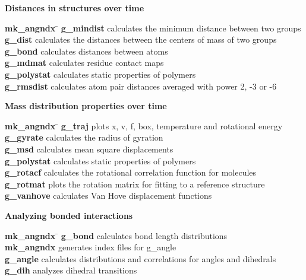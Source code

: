 \begin{description}
\item {\large\bf Distances in structures over time}
\vspace{-2ex}\begin{tabbing}
{\bf mk\_angndx} \= \kill
{\bf g\_mindist} \> calculates the minimum distance between two groups \\
{\bf g\_dist} \> calculates the distances between the centers of mass of two groups \\
{\bf g\_bond} \> calculates distances between atoms \\
{\bf g\_mdmat} \> calculates residue contact maps \\
{\bf g\_polystat} \> calculates static properties of polymers \\
{\bf g\_rmsdist} \> calculates atom pair distances averaged with power 2, -3 or -6 \\
\end{tabbing}\vspace{-2ex}

\item {\large\bf Mass distribution properties over time}
\vspace{-2ex}\begin{tabbing}
{\bf mk\_angndx} \= \kill
{\bf g\_traj} \> plots x, v, f, box, temperature and rotational energy \\
{\bf g\_gyrate} \> calculates the radius of gyration \\
{\bf g\_msd} \> calculates mean square displacements \\
{\bf g\_polystat} \> calculates static properties of polymers \\
{\bf g\_rotacf} \> calculates the rotational correlation function for molecules \\
{\bf g\_rotmat} \> plots the rotation matrix for fitting to a reference structure \\
{\bf g\_vanhove} \> calculates Van Hove displacement functions \\
\end{tabbing}\vspace{-2ex}

\item {\large\bf Analyzing bonded interactions}
\vspace{-2ex}\begin{tabbing}
{\bf mk\_angndx} \= \kill
{\bf g\_bond} \> calculates bond length distributions \\
{\bf mk\_angndx} \> generates index files for g\_angle \\
{\bf g\_angle} \> calculates distributions and correlations for angles and dihedrals \\
{\bf g\_dih} \> analyzes dihedral transitions \\
\end{tabbing}\vspace{-2ex}


\end{description}
